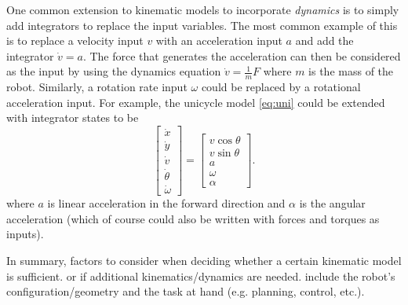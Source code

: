 One common extension to kinematic models to incorporate \textit{dynamics} is to simply add integrators to replace the input variables. The most common example of this is to replace a velocity input $v$ with an acceleration input $a$ and add the integrator $\dot{v} = a$. The force that generates the acceleration can then be considered as the input by using the dynamics equation $\dot{v} = \frac{1}{m}F$ where $m$ is the mass of the robot. Similarly, a rotation rate input $\omega$ could be replaced by a rotational acceleration input. For example, the unicycle model \eqref{eq:uni} could be extended with integrator states to be
\begin{equation} \label{eq:extendeduni}
\begin{bmatrix}
\dot{x} \\ \dot{y} \\ \dot{v} \\ \dot{\theta}  \\ \dot{\omega}
\end{bmatrix} = \begin{bmatrix}
v\cos \theta  \\
v\sin\theta \\
a \\
\omega \\
\alpha
\end{bmatrix}.
\end{equation}
where $a$ is linear acceleration in the forward direction and $\alpha$ is the angular acceleration (which of course could also be written with forces and torques as inputs).

In summary, factors to consider when deciding whether a certain kinematic model is sufficient. or if additional kinematics/dynamics are needed. include the robot's configuration/geometry and the task at hand (e.g. planning, control, etc.).